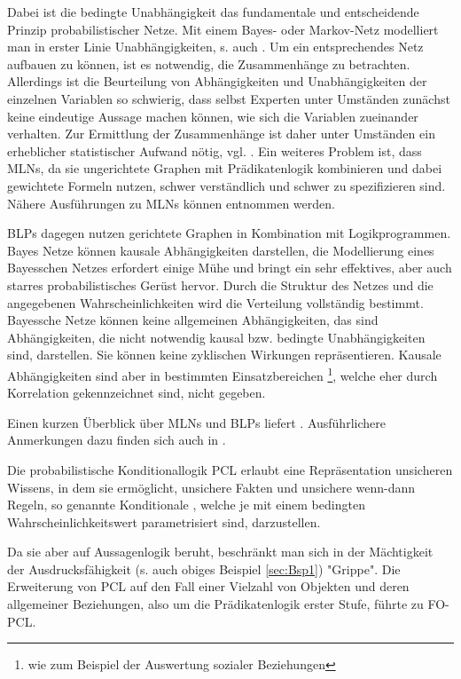 \documentclass[a4paper, 11pt]{book}
\begin{document}
Dabei ist die bedingte Unabhängigkeit das fundamentale und entscheidende Prinzip probabilistischer Netze. Mit einem Bayes- oder Markov-Netz modelliert man in erster Linie Unabhängigkeiten, s. auch \cite[Kap. 12.1 und 12.2]{BKI08}. Um ein entsprechendes Netz aufbauen zu können, ist es notwendig, die Zusammenhänge zu betrachten. Allerdings ist die Beurteilung von Abhängigkeiten und Unabhängigkeiten der einzelnen Variablen so schwierig, dass selbst Experten unter Umständen zunächst keine eindeutige Aussage machen können, wie sich die Variablen zueinander verhalten. Zur Ermittlung der Zusammenhänge ist daher unter Umständen ein erheblicher statistischer Aufwand nötig, vgl. \cite[12.6, S. 402 /403]{BKI08}.
 Ein weiteres Problem ist, dass MLNs, da sie ungerichtete Graphen mit Prädikatenlogik kombinieren und dabei gewichtete Formeln nutzen, schwer verständlich und schwer zu spezifizieren sind. Nähere Ausführungen zu MLNs können \cite{DR06} entnommen werden. 
 
 BLPs dagegen nutzen gerichtete Graphen in Kombination mit Logikprogrammen. Bayes Netze können kausale Abhängigkeiten darstellen, die Modellierung eines Bayesschen Netzes erfordert einige Mühe und bringt ein sehr effektives, aber auch starres probabilistisches Gerüst hervor. Durch die Struktur des Netzes und die angegebenen Wahrscheinlichkeiten wird die Verteilung vollständig bestimmt. Bayessche Netze können keine allgemeinen Abhängigkeiten, das sind Abhängigkeiten, die nicht notwendig kausal bzw. bedingte Unabhängigkeiten sind, darstellen. Sie können keine zyklischen Wirkungen repräsentieren. Kausale Abhängigkeiten sind aber in bestimmten Einsatzbereichen \footnote {wie zum Beispiel der Auswertung sozialer Beziehungen}, welche eher durch Korrelation gekennzeichnet sind, nicht gegeben.
 
Einen kurzen Überblick über MLNs und BLPs liefert \cite[Kap. 2.1 und 2.2]{FLT09}.
Ausführlichere Anmerkungen dazu finden sich auch in \cite[Kap. 2]{KIBFT11}.

Die probabilistische Konditionallogik PCL   erlaubt eine Repräsentation unsicheren Wissens, in dem sie ermöglicht,  unsichere Fakten und unsichere wenn-dann Regeln, so genannte Konditionale , welche je mit einem bedingten Wahrscheinlichkeitswert parametrisiert sind, darzustellen. 

Da sie aber auf Aussagenlogik beruht, beschränkt man sich in der Mächtigkeit der Ausdrucksfähigkeit (s. auch obiges Beispiel \ref{sec:Bsp1}) "{}Grippe"{}. Die Erweiterung von PCL auf den Fall einer Vielzahl von Objekten und deren allgemeiner Beziehungen, also um die Prädikatenlogik erster Stufe, führte zu FO-PCL.
\end{document}
